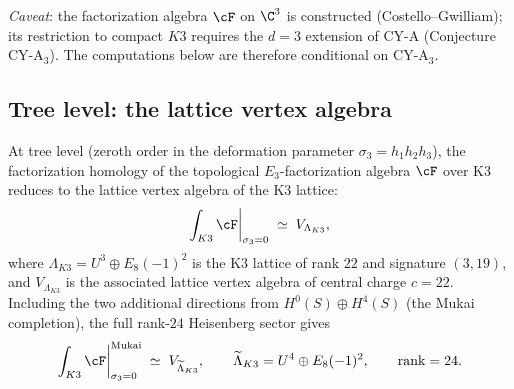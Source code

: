\emph{Caveat}: the factorization algebra $\cF$ on $\C^3$ is
constructed (Costello--Gwilliam); its restriction to compact $K3$
requires the $d=3$ extension of CY-A (Conjecture CY-A$_3$).
The computations below are therefore conditional on CY-A$_3$.

\subsection{Tree level: the lattice vertex algebra}
\label{subsec:k3-fact-tree}

\begin{conjecture}
\label{conj:k3-fact-tree-level}
\ClaimStatusConjectured
At tree level (zeroth order in the deformation parameter
$\sigma_3 = h_1 h_2 h_3$), the factorization homology of the
topological $E_3$-factorization algebra $\cF$ over K3 reduces to the
lattice vertex algebra of the K3 lattice:
\begin{equation}\label{eq:k3-fact-tree}
  \int_{K3} \cF\bigg|_{\sigma_3 = 0}
  \;\simeq\;
  V_{\Lambda_{K3}},
\end{equation}
where $\Lambda_{K3} = U^3 \oplus E_8(-1)^2$ is the K3 lattice of
rank $22$ and signature $(3,19)$, and $V_{\Lambda_{K3}}$ is the
associated lattice vertex algebra of central charge $c = 22$.
Including the two additional directions from $H^0(S) \oplus H^4(S)$
(the Mukai completion), the full rank-$24$ Heisenberg sector gives
\begin{equation}\label{eq:k3-fact-tree-full}
  \int_{K3} \cF\bigg|_{\sigma_3 = 0}^{\mathrm{Mukai}}
  \;\simeq\;
  V_{\widetilde{\Lambda}_{K3}},
  \qquad
  \widetilde{\Lambda}_{K3}
  = U^4 \oplus E_8(-1)^2,
  \qquad
  \operatorname{rank} = 24.
\end{equation}
\end{conjecture}

